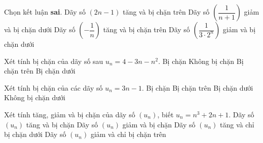 \begin{ex}%
	Chọn kết luận  {\bf sai}.
	 \choice
		 {\True Dãy số $\left(2n-1\right)$ tăng và bị chặn trên}
		{Dãy số $\left(\dfrac{1}{n+1}\right)$ giảm và  bị chặn dưới}
		{Dãy số $\left(-\dfrac{1}{n}\right)$  tăng và bị chặn trên}
		{Dãy số $\left(\dfrac{1}{3\cdot 2^n}\right)$  giảm và bị chặn dưới}
\end{ex}

\begin{ex}%
	Xét tính bị chặn của  dãy số sau $u_n=4-3n-n^2$.
	 \choice
		{Bị chặn} 
		{Không  bị chặn}
		{\True  Bị chặn trên}
		{Bị  chặn dưới}
\end{ex}

\begin{ex}%
	 Xét tính bị chặn của các dãy số $u_n=3n-1$.
	 \choice
		{Bị  chặn}
		{Bị chặn trên} 
		{\True  Bị chặn dưới}
		{Không bị  chặn dưới}
\end{ex}

\begin{ex}%
	Xét tính tăng, giảm  và bị chặn của dãy số $(u_n)$, biết $ {u_n}=n^3+2n+1$.
	\choice 
		{Dãy số $(u_n)$  tăng và bị chặn}
		{Dãy số $(u_n)$ giảm  và bị chặn}
		{\True Dãy  số $(u_n)$ tăng và chỉ bị chặn dưới}
		{ Dãy số $(u_n)$ giảm và chỉ bị chặn  trên}
\end{ex}

